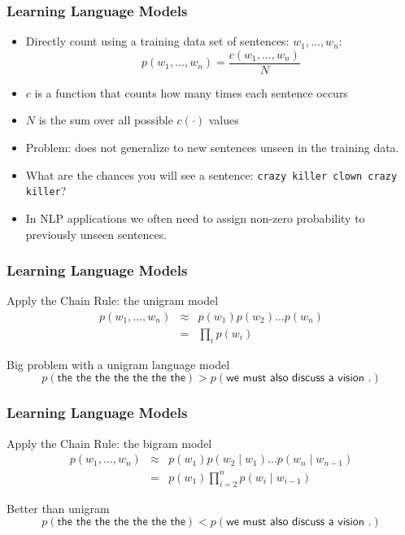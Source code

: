 \begin{frame}
\frametitle{Learning Language Models}
\begin{itemize}[<+->]
\item Directly count using a training data set of sentences: $w_1, \ldots, w_n$:
\[ p(w_1, \ldots, w_n) = \frac{c(w_1, \ldots, w_n)}{N} \]
\item $c$ is a function that counts how many times each sentence occurs
\item $N$ is the sum over all possible $c(\cdot)$ values
\item Problem: does not generalize to new sentences unseen in the training data.
\item What are the chances you will see a sentence: \texttt{crazy killer clown crazy killer}?
\item In NLP applications we often need to assign non-zero probability to previously unseen sentences.
\end{itemize}
\end{frame}

\begin{frame}
\frametitle{Learning Language Models}
\begin{block}{Apply the Chain Rule: the unigram model}
\begin{eqnarray*}
p(w_1, \ldots, w_n) &\approx& p(w_1) p(w_2) \ldots p(w_n) \\
&=& \prod_i p(w_i)
\end{eqnarray*}
\end{block}
\pause
\begin{block}{Big problem with a unigram language model}
\[ p(\textsf{the the the the the the the}) > p(\textsf{we must also discuss a vision .}) \]
\end{block}

\end{frame}


\begin{frame}
\frametitle{Learning Language Models}
\begin{block}{Apply the Chain Rule: the bigram model}
\begin{eqnarray*}
p(w_1, \ldots, w_n) &\approx& p(w_1) p(w_2 \mid w_1) \ldots p(w_n \mid w_{n-1}) \\
&=& p(w_1) \prod_{i=2}^n p(w_i \mid w_{i-1})
\end{eqnarray*}
\end{block}
\pause
\begin{block}{Better than unigram}
\[ p(\textsf{the the the the the the the}) < p(\textsf{we must also discuss a vision .}) \]
\end{block}
\end{frame}

